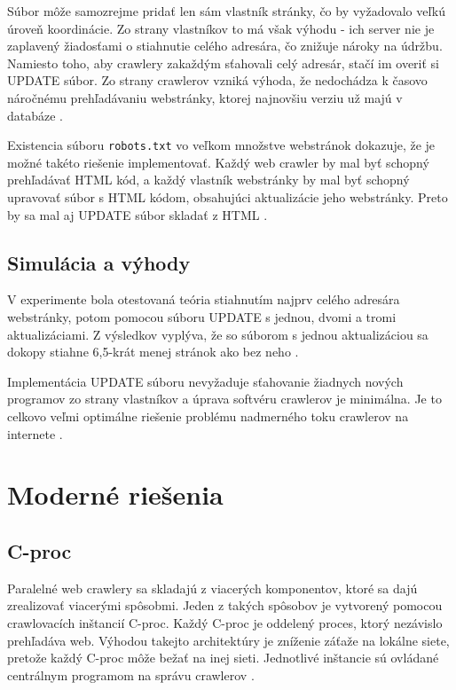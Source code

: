 \documentclass[10pt,twoside,slovak,a4paper]{article}
\begin{document}
Súbor môže samozrejme pridať len sám vlastník stránky, čo by vyžadovalo veľkú úroveň koordinácie. Zo strany vlastníkov to má však výhodu - ich server nie je zaplavený žiadosťami o stiahnutie celého adresára, čo znižuje nároky na údržbu. Namiesto toho, aby crawlery zakaždým sťahovali celý adresár, stačí im overiť si UPDATE súbor. Zo strany crawlerov vzniká výhoda, že nedochádza k časovo náročnému prehľadávaniu webstránky, ktorej najnovšiu verziu už majú v databáze \cite{mishra2010smart}.

Existencia súboru \texttt{robots.txt} vo veľkom množstve webstránok dokazuje, že je možné takéto riešenie implementovať. Každý web crawler by mal byť schopný prehľadávať HTML kód, a každý vlastník webstránky by mal byť schopný upravovať súbor s HTML kódom, obsahujúci aktualizácie jeho webstránky. Preto by sa mal aj UPDATE súbor skladať z HTML \cite{mishra2010smart}. 

\subsection{Simulácia a výhody}

V experimente bola otestovaná teória stiahnutím najprv celého adresára webstránky, potom pomocou súboru UPDATE s jednou, dvomi a tromi aktualizáciami. Z výsledkov vyplýva, že so súborom s jednou aktualizáciou sa dokopy stiahne 6,5-krát menej stránok ako bez neho \cite{mishra2010smart}.

Implementácia UPDATE súboru nevyžaduje sťahovanie žiadnych nových programov zo strany vlastníkov a úprava softvéru crawlerov je minimálna. Je to celkovo veľmi optimálne riešenie problému nadmerného toku crawlerov na internete \cite{mishra2010smart}.

\section{Moderné riešenia}

\subsection{C-proc}

Paralelné web crawlery sa skladajú z viacerých komponentov, ktoré sa dajú zrealizovať viacerými spôsobmi. Jeden z takých spôsobov je vytvorený pomocou crawlovacích inštancií C-proc. Každý C-proc je oddelený proces, ktorý nezávislo prehľadáva web. Výhodou takejto architektúry je zníženie záťaže na lokálne siete, pretože každý C-proc môže bežať na inej sieti. Jednotlivé inštancie sú ovládané centrálnym programom na správu crawlerov \cite{sharma2011novel}.
\end{document}
